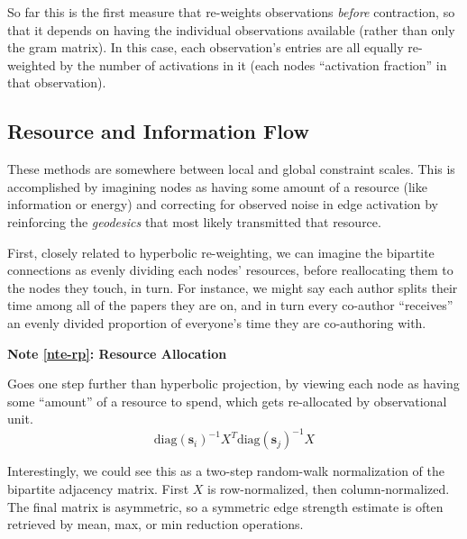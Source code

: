 \documentclass[%
	12pt,
		oneside,
		letterpaper
]{book}
\newcounter{quartocalloutnteno}
\newcommand{\quartocalloutnte}[1]{\refstepcounter{quartocalloutnteno}\label{#1}}
\begin{document}
So far this is the first measure that re-weights observations \emph{before} contraction, so that it depends on having the individual observations available (rather than only the gram matrix).
In this case, each observation's entries are all equally re-weighted by the number of activations in it (each nodes ``activation fraction'' in that observation).

\subsection{Resource and Information Flow}\label{resource-and-information-flow}

These methods are somewhere between local and global constraint scales.
This is accomplished by imagining nodes as having some amount of a resource (like information or energy) and correcting for observed noise in edge activation by reinforcing the \emph{geodesics} that most likely transmitted that resource.

First, closely related to hyperbolic re-weighting, we can imagine the bipartite connections as evenly dividing each nodes' resources, before reallocating them to the nodes they touch, in turn.
For instance, we might say each author splits their time among all of the papers they are on, and in turn every co-author ``receives'' an evenly divided proportion of everyone's time they are co-authoring with.

\begin{tcolorbox}[enhanced jigsaw, bottomrule=.15mm, colback=white, breakable, toprule=.15mm, colframe=quarto-callout-note-color-frame, leftrule=.75mm, arc=.35mm, opacityback=0, rightrule=.15mm, left=2mm]

\quartocalloutnte{nte-rp} 

\vspace{-3mm}\textbf{Note \ref*{nte-rp}: Resource Allocation}\vspace{3mm}

Goes one step further than hyperbolic projection, by viewing each node as having some ``amount'' of a resource to spend, which gets re-allocated by observational unit. \autocite{Bipartitenetworkprojection_Zhou2007}
\[ \text{diag}(\mathbf{s}_i)^{-1}X^T\text{diag}(\mathbf{s}_j)^{-1}X \]

\end{tcolorbox}

Interestingly, we could see this as a two-step random-walk normalization of the bipartite adjacency matrix.
First \(X\) is row-normalized, then column-normalized.
The final matrix is asymmetric, so a symmetric edge strength estimate is often retrieved by mean, max, or min reduction operations.
\end{document}

